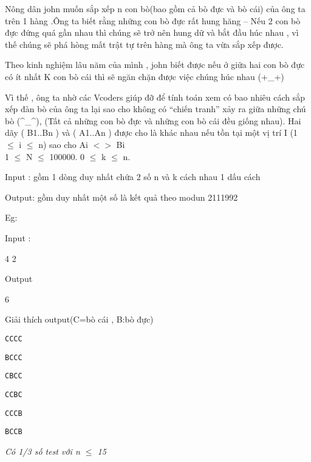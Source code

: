 



   Nông dân john muốn sắp xếp n con bò(bao gồm cả bò đực và bò cái) của ông ta trên 1 hàng .Ông ta biết rằng những con bò đực rất hung hăng – Nếu 2 con bò đực đứng quá gần nhau thì chúng sẽ trở nên hung dữ và bắt đầu húc nhau , vì thế chúng sẽ phá hòng mất trật tự trên hàng mà ông ta vừa sắp xếp được.  

   Theo kinh nghiệm lâu năm của mình , john biết được nếu ở giữa hai con bò đực có ít nhất K con bò cái thì sẽ ngăn chặn được việc chúng húc nhau (+\_+)  

   Vì thế , ông ta nhờ các Vcoders giúp đỡ để tính toán xem có bao nhiêu cách sắp xếp đàn bò của ông ta lại sao cho không có “chiến tranh” xảy ra giữa những chú bò (\textasciicircum\_\textasciicircum), (Tất cả những con bò đực và những con bò cái đều giống nhau). Hai dãy (       B1..Bn       ) và (       A1..An       ) được cho là khác nhau nếu tồn tại một vị trí I (1 $\le$ i $\le$ n) sao cho       Ai $<$$>$ Bi    
\\

   1 $\le$ N $\le$ 100000. 0 $\le$ k $\le$ n.  

   Input : gồm 1 dòng duy nhất chứa 2 số n và k cách nhau 1 dấu cách  

   Output: gồm duy nhất một số là kết quả theo modun 2111992  



   Eg:  

   Input :  



   4 2  



   Output  



   6  



   Giải thích output(C=bò cái , B:bò đực)  
\begin{verbatim}
CCCC\end{verbatim}
\begin{verbatim}
BCCC\end{verbatim}
\begin{verbatim}
CBCC\end{verbatim}
\begin{verbatim}
CCBC\end{verbatim}
\begin{verbatim}
CCCB\end{verbatim}
\begin{verbatim}
BCCB\end{verbatim}

\emph{    Có 1/3 số test với n $\le$ 15   }
